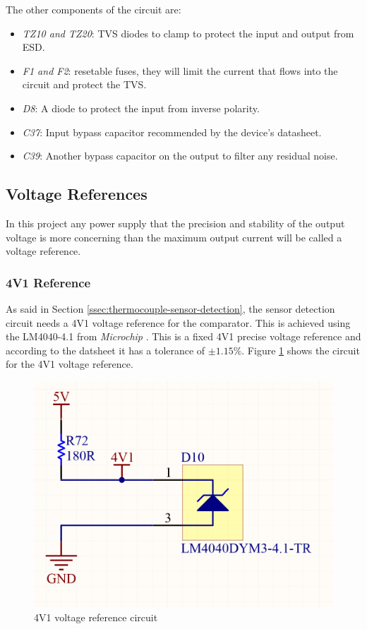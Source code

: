			The other components of the circuit are:

			\begin{itemize}
				\item\textit{TZ10 and TZ20}: TVS diodes to clamp to protect the input and output from ESD.
				\item\textit{F1 and F2}: resetable fuses, they will limit the current that flows into the circuit and protect the TVS.
				\item\textit{D8}: A diode to protect the input from inverse polarity.
				\item\textit{C37}: Input bypass capacitor recommended by the device's datasheet.
				\item\textit{C39}: Another bypass capacitor on the output to filter any residual noise.
			\end{itemize}

	\subsection{Voltage References}\label{ssec:voltage-references}

		In this project any power supply that the precision and stability of the output voltage is more concerning than the maximum output current will be called a voltage reference.

		\subsubsection{4V1 Reference}\label{sssec:4v1-reference}

			As said in Section \ref{ssec:thermocouple-sensor-detection}, the sensor detection circuit needs a 4V1 voltage reference for the comparator. This is achieved using the LM4040-4.1 from \textit{Microchip} \cite{lm4040-datasheet}. This is a fixed 4V1 precise voltage reference and according to the datsheet it has a tolerance of $\pm1.15\%$. Figure \ref{fig:4v1-voltage-ref} shows the circuit for the 4V1 voltage reference.

			\begin{figure}[htbp]
				\centering
					\includegraphics[scale=1.1]{figuras/fig-4v1-voltage-ref}
				\caption{4V1 voltage reference circuit}
				\label{fig:4v1-voltage-ref}
			\end{figure}

